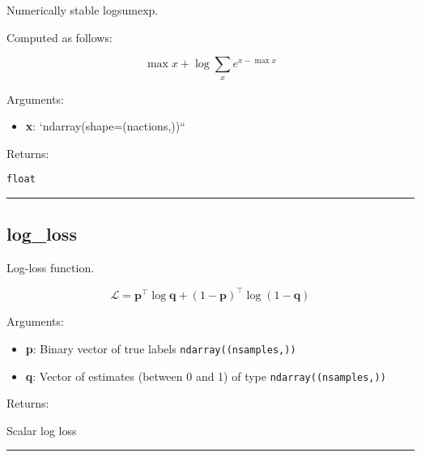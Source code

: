 \begin{Shaded}
\begin{Highlighting}[]
\end{Highlighting}
\end{Shaded}

Numerically stable logsumexp.

Computed as follows:

\[
\max x + \log \sum_x e^{x - \max x}
\]

Arguments:

\begin{itemize}
\tightlist
\item
  \textbf{x}: `ndarray(shape=(nactions,))``
\end{itemize}

Returns:

\texttt{float}

\begin{center}\rule{0.5\linewidth}{\linethickness}\end{center}

\hypertarget{log_loss}{%
\subsection{log\_loss}\label{log_loss}}

\begin{Shaded}
\begin{Highlighting}[]
\end{Highlighting}
\end{Shaded}

Log-loss function.

\[
\mathcal L = \mathbf p^\top \log \mathbf q + (1-\mathbf p)^\top \log (1 - \mathbf q)
\]

Arguments:

\begin{itemize}
\tightlist
\item
  \textbf{p}: Binary vector of true labels \texttt{ndarray((nsamples,))}
\item
  \textbf{q}: Vector of estimates (between 0 and 1) of type
  \texttt{ndarray((nsamples,))}
\end{itemize}

Returns:

Scalar log loss

\begin{center}\rule{0.5\linewidth}{\linethickness}\end{center}
